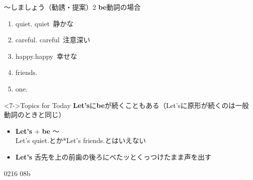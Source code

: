\documentclass[aspectratio=169,xcolor={dvipsnames,table}]{beamer}
\begin{document}
\begin{frame}[plain]{～しましょう（勧誘・提案）2}
  \textbf{be}動詞の場合\pause
  \begin{enumerate}[<+->]
    \item {}  quiet.%
          \hfill{\scriptsize quiet  \,静かな}
    \item {}  careful.%
          \hfill{\scriptsize careful  \,注意深い}
    \item {}  happy.\hfill{\scriptsize happy  \,幸せな}
    \item {}  friends.
    \item {}  one.
  \end{enumerate}

  \vfill

  \begin{block}<7->{Topics for Today}
    \textbf{Let's}に\textbf{be}が続くこともある{\footnotesize （Let'sに原形が続くのは一般動詞のときと同じ）}
    \begin{itemize}[square]\small
      \item \textbf{Let's} $+$ \textbf{be} ～\\
            \hfill{\footnotesize *Let's quiet.とか*Let's friends.とはいえない}
      \item \textbf{Let's} \hfill{\scriptsize 舌先を上の前歯の後ろにべたッとくっつけたまま声を出す}
    \end{itemize}
  \end{block}
  \hfill{\tiny 0216}\,{\scriptsize {}}\,{\tiny 08b}
\end{frame}
\end{document}
